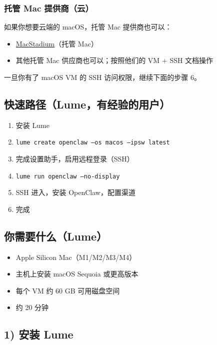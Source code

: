 \subsubsection{托管 Mac 提供商（云）}


如果你想要云端的 macOS，托管 Mac 提供商也可以：

\begin{itemize}
  \item \href{https://www.macstadium.com/}{MacStadium}（托管 Mac）
  \item 其他托管 Mac 供应商也可以；按照他们的 VM + SSH 文档操作
\end{itemize}


一旦你有了 macOS VM 的 SSH 访问权限，继续下面的步骤 6。

\hrulefill


\subsection{快速路径（Lume，有经验的用户）}


\begin{enumerate}
  \item 安装 Lume
  \item \texttt{lume create openclaw --os macos --ipsw latest}
  \item 完成设置助手，启用远程登录（SSH）
  \item \texttt{lume run openclaw --no-display}
  \item SSH 进入，安装 OpenClaw，配置渠道
  \item 完成
\end{enumerate}


\hrulefill


\subsection{你需要什么（Lume）}


\begin{itemize}
  \item Apple Silicon Mac（M1/M2/M3/M4）
  \item 主机上安装 macOS Sequoia 或更高版本
  \item 每个 VM 约 60 GB 可用磁盘空间
  \item 约 20 分钟
\end{itemize}


\hrulefill


\subsection{1) 安装 Lume}


